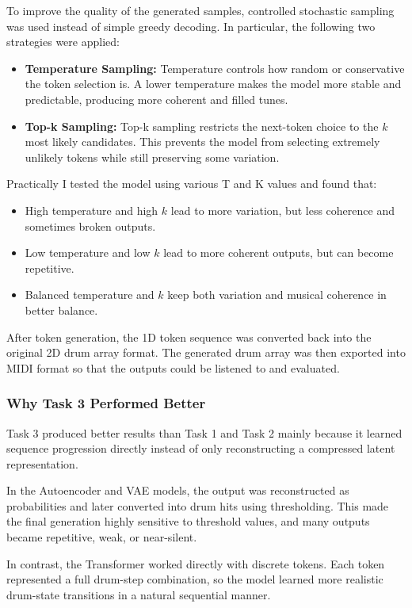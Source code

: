 \documentclass[conference]{IEEEtran}
\begin{document}
To improve the quality of the generated samples, {controlled stochastic sampling} was used instead of simple greedy decoding. In particular, the following two strategies were applied:
\begin{itemize}
    \item \textbf{Temperature Sampling:} Temperature controls how random or conservative the token selection is. A lower temperature makes the model more stable and predictable, producing more coherent and filled tunes.
    \item \textbf{Top-k Sampling:} Top-k sampling restricts the next-token choice to the $k$ most likely candidates. This prevents the model from selecting extremely unlikely tokens while still preserving some variation.
\end{itemize}
Practically I tested the model using various T and K values and found that:
\begin{itemize}
    \item High temperature and high $k$ lead to more variation, but less coherence and sometimes broken outputs.
    \item Low temperature and low $k$ lead to more coherent outputs, but can become repetitive.
    \item Balanced temperature and $k$ keep both variation and musical coherence in better balance.
\end{itemize}
After token generation, the 1D token sequence was converted back into the original 2D drum array format. The generated drum array was then exported into MIDI format so that the outputs could be listened to and evaluated.

\subsubsection{Why Task 3 Performed Better}
Task 3 produced better results than Task 1 and Task 2 mainly because it learned sequence progression directly instead of only reconstructing a compressed latent representation.

In the Autoencoder and VAE models, the output was reconstructed as probabilities and later converted into drum hits using thresholding. This made the final generation highly sensitive to threshold values, and many outputs became repetitive, weak, or near-silent.

In contrast, the Transformer worked directly with discrete tokens. Each token represented a full drum-step combination, so the model learned more realistic drum-state transitions in a natural sequential manner.
\end{document}
